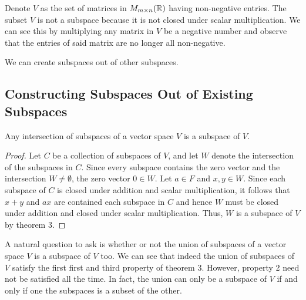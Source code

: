 \begin{eg}
   Denote \( V  \) as the set of matrices in \( M_{m \times n}(\mathbb{R} ) \) having non-negative entries. The subset \( V  \) is not a subspace because it is not closed under scalar multiplication. We can see this by multiplying any matrix in \( V  \) be a negative number and observe that the entries of said matrix are no longer all non-negative.  
\end{eg}

We can create subspaces out of other subspaces.

\subsection{Constructing Subspaces Out of Existing Subspaces}

\begin{theorem}
   Any intersection of subspaces of a vector space \( V  \) is a subspace of \( V  \).
\end{theorem}

\begin{proof}
Let \( C  \) be a collection of subspaces of \( V  \), and let \( W  \) denote the intersection of the subspaces in \( C  \). Since every subspace contains the zero vector and the intersection \( W  \neq \emptyset  \), the zero vector \( 0 \in W  \). Let \( a \in F  \) and \( x,y \in W  \). Since each subspace of \( C  \) is closed under addition and scalar multiplication, it follows that \( x + y  \) and \( ax  \) are contained each subspace in \( C  \) and hence \(W   \) must be closed under addition and closed under scalar multiplication. Thus, \( W  \) is a subspace of \( V  \) by theorem 3.
\end{proof}

A natural question to ask is whether or not the union of subspaces of a vector space \( V  \) is a subspace of \( V  \) too. We can see that indeed the union of subspaces of \( V  \) satisfy the first first and third property of theorem 3. However, property 2 need not be satisfied all the time. In fact, the union can only be a subspace of \( V  \) if and only if one the subspaces is a subset of the other.


